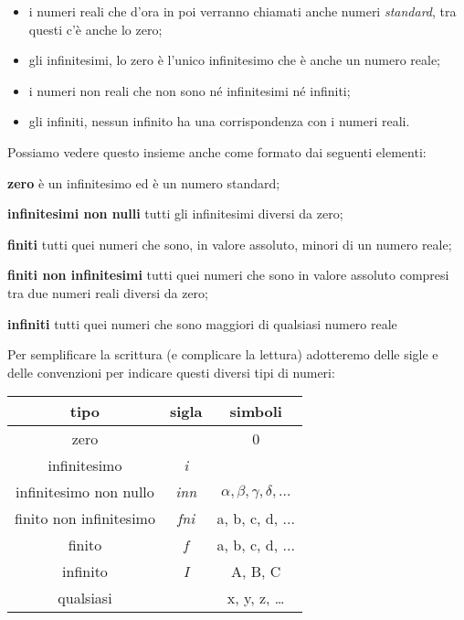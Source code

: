 \begin{itemize} [noitemsep]
 \item i numeri reali che d'ora in poi verranno chiamati anche numeri 
\emph{standard}, tra questi c'è anche lo zero;
 \item gli infinitesimi, lo zero è l'unico infinitesimo che è anche un numero 
reale;
 \item i numeri non reali che non sono né infinitesimi né infiniti;
 \item gli infiniti, nessun infinito ha una corrispondenza con i numeri reali.
\end{itemize}

Possiamo vedere questo insieme anche come formato dai seguenti elementi:

\begin{description} [noitemsep]
 \item \textbf{zero}
 è un infinitesimo ed è un numero standard;
 \item \textbf{infinitesimi non nulli}
 tutti gli infinitesimi diversi da zero;
 \item \textbf{finiti}
 tutti quei numeri che sono, in valore assoluto, minori di un numero reale;
 \item \textbf{finiti non infinitesimi}
 tutti quei numeri che sono in valore assoluto compresi tra due numeri reali 
 diversi da zero;
 \item \textbf{infiniti}
 tutti quei numeri che sono maggiori di qualsiasi numero reale

\end{description}
 
Per semplificare la scrittura (e complicare la lettura) adotteremo delle sigle 
e delle convenzioni per indicare questi diversi tipi di numeri:

\begin{center}
\begin{tabular}{ccc}\toprule
tipo & sigla & simboli\\\midrule
zero &  & 0\\
infinitesimo & \emph{i} & \\
infinitesimo non nullo & \emph{inn} & $\alpha, \beta, \gamma, \delta, \dots$\\
finito non infinitesimo& \emph{fni} & a, b, c, d, ...\\
finito & \emph{f} & a, b, c, d, ...\\
infinito & \emph{I} & A, B, C\\
qualsiasi &  & x, y, z, \ldots\\\bottomrule
\end{tabular}
\label{tab:insnum_tipi}
\end{center}


